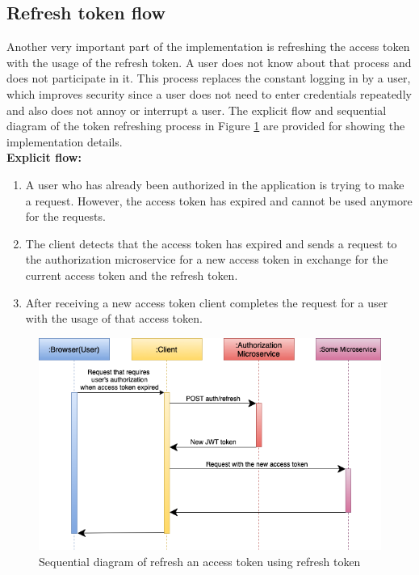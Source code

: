 \subsection{Refresh token flow} Another very important part of the implementation is refreshing the access token with the usage of the refresh token. A user does not know about that process and does not participate in it. This process replaces the constant logging in by a user, which improves security since a user does not need to enter credentials repeatedly and also does not annoy or interrupt a user. The explicit flow and sequential diagram of the token refreshing process in Figure \ref{refresh} are provided for showing the implementation details.\\

\noindent \textbf{Explicit flow:}

\begin{enumerate}
    \item A user who has already been authorized in the application is trying to make a request. However, the access token has expired and cannot be used anymore for the requests.
    \item The client detects that the access token has expired and sends a request to the authorization microservice for a new access token in exchange for the current access token and the refresh token.
    \item After receiving a new access token client completes the request for a user with the usage of that access token.
\end{enumerate}

\begin{figure}[hp]
\centering
\includegraphics[scale=0.6]{../png/refresh_token.png}
\caption{Sequential diagram of refresh an access token using refresh token}
\label{refresh}
\end{figure}
